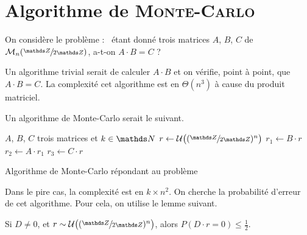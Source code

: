 
\section{Algorithme de {\scshape Monte-Carlo}}

On considère le problème : \guillemotleft~étant donné trois matrices $A$, $B$, $C$\/ de $\mathcal{M}_n(\sfrac{\Z}{2\Z})$, a-t-on $A\cdot B = C$\/ ?~\guillemotright

Un algorithme trivial serait de calculer $A\cdot B$\/ et on vérifie, point à point, que $A\cdot B = C$.
La complexité cet algorithme est en $\Theta(n^3)$\/ à cause du produit matriciel.

Un algorithme de {\sc Monte-Carlo}\/ serait le suivant.

\begin{algorithm}[H]
	\centering
	\begin{algorithmic}[1]
		\Entree $A$, $B$, $C$\/ trois matrices et $k \in \N$
			\State $r \gets \mathcal{U}\big((\sfrac{\Z}{2\Z})^n\big)$\/\/
			\State $r_1 \gets B\cdot r$\/ 
			\State $r_2 \gets A\cdot r_1$\/ 
			\State $r_3 \gets C\cdot r$\/ 
				\State {}\/
			\EndIf
		\EndFor
		\State {}\/
	\end{algorithmic}
	\caption{Algorithme de {\sc Monte-Carlo} répondant au problème}
\end{algorithm}

Dans le pire cas, la complexité est en $k \times n^2$. On cherche la probabilité d'erreur de cet algorithme. Pour cela, on utilise le lemme suivant.

\begin{lem}
	Si $D \neq 0$, et $r \sim \mathcal{U}\big((\sfrac\Z{2\Z})^n\big)$, alors $P(D\cdot r = 0) \le \frac{1}{2}$.
\end{lem}

